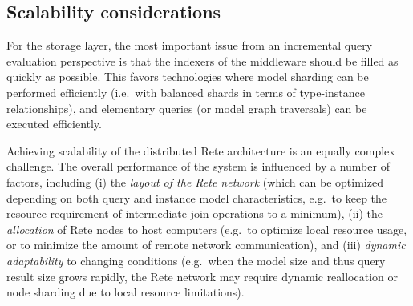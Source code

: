 \subsection{Scalability considerations}
For the storage layer, the most important issue from an incremental query evaluation perspective is that the indexers of the middleware should be filled as quickly as possible. This favors technologies where model sharding can be performed efficiently (i.e.\ with balanced shards in terms of type-instance relationships), and elementary queries (or model graph traversals) can be executed efficiently.

Achieving scalability of the distributed Rete architecture is an equally complex challenge. The overall performance of the system is influenced by a number of factors, including (i) the \emph{layout of the Rete network} (which can be optimized depending on both query and instance model characteristics, e.g.\ to keep the resource requirement of intermediate join operations to a minimum), (ii) the \emph{allocation} of Rete nodes to host computers (e.g.\ to optimize local resource usage, or to minimize the amount of remote network communication), and (iii) \emph{dynamic adaptability} to changing conditions (e.g.\ when the model size and thus query result size grows rapidly, the Rete network may require dynamic reallocation or node sharding due to local resource limitations).
